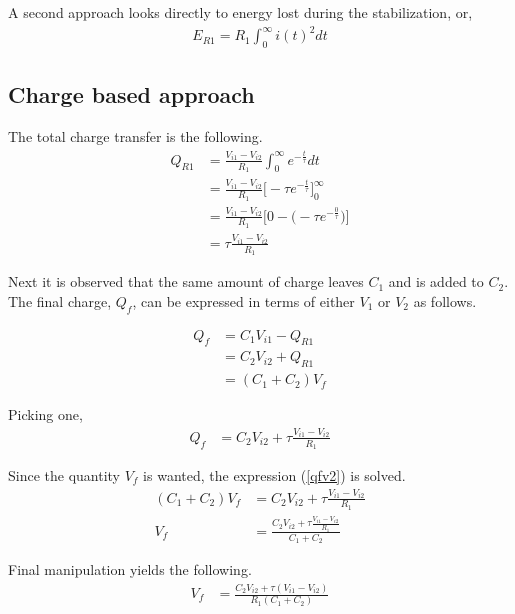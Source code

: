 \documentclass[12pt,letterpaper]{report}
\begin{document}
	A second approach looks directly to energy lost during the stabilization, or,
	\begin{align}
		E_{R1} = R_1 \int_{0}^{\infty} i(t)^2 dt
	\end{align}

	\subsection{Charge based approach}
	The total charge transfer is the following.
	\begin{align}
	Q_{R1} &= \frac{V_{i1} - V_{i2}}{R_1}  \int_{0}^{\infty}  e^{-\frac{t}{\tau}} dt \nonumber \\
	&= \frac{V_{i1} - V_{i2}}{R_1}   \bigg[ -\tau e^{-\frac{t}{\tau}} \bigg ]_{0}^{\infty} \nonumber \\
	&= \frac{V_{i1} - V_{i2}}{R_1}  \bigg[ 0 - \big ( -\tau e^{-\frac{0}{\tau}} \big) \bigg ] \nonumber \\
	&= \tau \frac{V_{i1} - V_{i2}}{R_1}
	\end{align}	

	Next it is observed that the same amount of charge leaves $C_1$ and is added to $C_2$.  The final charge, $Q_f$, can be expressed in terms of either $V_1$ or $V_2$ as follows.
	
	\begin{align}
	Q_{f} &= C_1 V_{i1} - Q_{R1} \nonumber \\
	&= C_2 V_{i2} + Q_{R1} \nonumber \\
	&= (C_1 + C_2)V_f
	\end{align}

	Picking one,
	\begin{align}
		Q_{f} &= C_2 V_{i2} + \tau \frac{V_{i1} - V_{i2}}{R_1} \label{qfv2}
	\end{align}

	Since the quantity $V_f$ is wanted, the expression (\ref{qfv2}) is solved.
	\begin{align}
		(C_1 + C_2)V_f &= C_2 V_{i2} + \tau \frac{V_{i1} - V_{i2}}{R_1}  \nonumber \\
		V_f &= \frac {C_2 V_{i2} + \tau \frac{V_{i1} - V_{i2}}{R_1}} {C_1 + C_2} 		
	\end{align}

	Final manipulation yields the following.
	\begin{align}
		V_f &= \frac {C_2 V_{i2} + \tau (V_{i1} - V_{i2})} {R_1(C_1 + C_2)} \label{vfinal_cg_based}
	\end{align}
\end{document}
